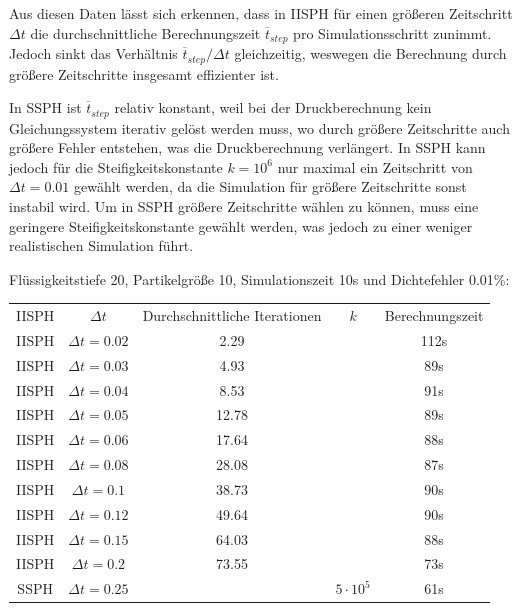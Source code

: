 \documentclass{scrreprt}
\begin{document}
Aus diesen Daten lässt sich erkennen,
dass in IISPH für einen größeren Zeitschritt $\Delta t$ die durchschnittliche Berechnungszeit $\overline{t}_{step}$ pro Simulationsschritt zunimmt.
Jedoch sinkt das Verhältnis $\overline{t}_{step} / \Delta t$ gleichzeitig, weswegen die Berechnung durch größere Zeitschritte insgesamt effizienter ist.

In SSPH ist $\overline{t}_{step}$ relativ konstant, weil bei der Druckberechnung kein Gleichungssystem iterativ gelöst werden muss,
wo durch größere Zeitschritte auch größere Fehler entstehen, was die Druckberechnung verlängert.
In SSPH kann jedoch für die Steifigkeitskonstante $k = 10^6$ nur maximal ein Zeitschritt von $\Delta t = 0.01$ gewählt werden,
da die Simulation für größere Zeitschritte sonst instabil wird.
Um in SSPH größere Zeitschritte wählen zu können,  muss eine geringere Steifigkeitskonstante gewählt werden, was jedoch zu einer weniger realistischen Simulation führt.

Flüssigkeitstiefe 20, Partikelgröße 10, Simulationszeit 10s und Dichtefehler 0.01\%:
\begin{center}
    \begin{tabular}{c c c c c}
        IISPH & $\Delta t$ & Durchschnittliche Iterationen & $k$ & Berechnungszeit\\
        IISPH & $\Delta t = 0.02$ & 2.29 && 112s\\
        IISPH & $\Delta t = 0.03$ & 4.93 && 89s\\
        IISPH & $\Delta t = 0.04$ & 8.53 && 91s\\
        IISPH & $\Delta t = 0.05$ & 12.78 && 89s\\
        IISPH & $\Delta t = 0.06$ & 17.64 && 88s\\
        IISPH & $\Delta t = 0.08$ & 28.08 && 87s\\
        IISPH & $\Delta t = 0.1$ & 38.73 && 90s\\
        IISPH & $\Delta t = 0.12$ & 49.64 && 90s\\
        IISPH & $\Delta t = 0.15$ & 64.03 && 88s\\
        IISPH & $\Delta t = 0.2$ & 73.55 && 73s\\
        SSPH & $\Delta t = 0.25$ && $5 \cdot 10^5$ & 61s\\ 
    \end{tabular}
\end{center}
\end{document}
